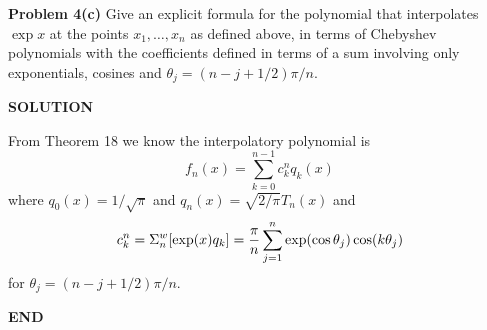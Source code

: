 \documentclass[12pt,a4paper]{article}
\begin{document}
\textbf{Problem 4(c)} Give an explicit formula for the polynomial that interpolates $\exp x$ at the points $x_1,\ensuremath{\ldots},x_n$ as defined above, in terms of Chebyshev polynomials with the coefficients defined in terms of a sum involving only exponentials, cosines and $\ensuremath{\theta}_j = (n-j+1/2)\ensuremath{\pi}/n$.

\textbf{SOLUTION}

From Theorem 18 we know the interpolatory polynomial is 
\[
f_n(x) = \ensuremath{\sum}_{k=0}^{n-1} c_k^n q_k(x)
\]
where $q_0(x) = 1/\sqrt{\ensuremath{\pi}}$ and $q_n(x) = \sqrt{2/\ensuremath{\pi}} T_n(x)$ and
\[
c_k^n = \ensuremath{\Sigma}_n^w[\exp(x) q_k] = {\ensuremath{\pi} \over n} \ensuremath{\sum}_{j=1}^n \exp( \cos \ensuremath{\theta}_j) \cos(k \ensuremath{\theta}_j)
\]
for $\ensuremath{\theta}_j = (n-j+1/2)\ensuremath{\pi}/n$.

\textbf{END}
\end{document}
